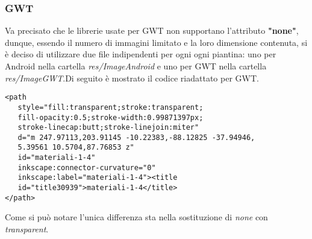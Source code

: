 \subsubsection*{GWT}
Va precisato che le librerie usate per GWT non supportano l'attributo \textbf{"none"}, dunque, essendo il numero di immagini limitato e la loro dimensione contenuta, si \`e deciso di utilizzare due file indipendenti per ogni ogni piantina: uno per Android nella cartella \textit{res/ImageAndroid} e uno per GWT nella cartella \textit{res/ImageGWT}.Di seguito \`e mostrato il codice riadattato per GWT.
\begin{lstlisting}
<path
   style="fill:transparent;stroke:transparent;
   fill-opacity:0.5;stroke-width:0.99871397px;
   stroke-linecap:butt;stroke-linejoin:miter"
   d="m 247.97113,203.91145 -10.22383,-88.12825 -37.94946,
   5.39561 10.5704,87.76853 z"
   id="materiali-1-4"
   inkscape:connector-curvature="0"
   inkscape:label="materiali-1-4"><title
   id="title30939">materiali-1-4</title>
</path> 
\end{lstlisting}
Come si pu\`o notare l'unica differenza sta nella sostituzione di \textit{none} con \textit{transparent}.
